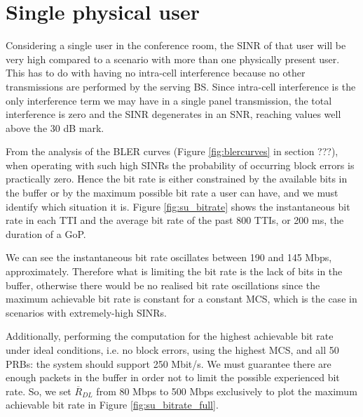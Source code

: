 \section{Single physical user} \label{sec:single-user}

Considering a single user in the conference room, the SINR of that user will be very high compared to a scenario with more than one physically present user. This has to do with having no intra-cell interference because no other transmissions are performed by the serving \acs{BS}. Since intra-cell interference is the only interference term we may have in a single panel transmission, the total interference is zero and the SINR degenerates in an SNR, reaching values well above the 30 dB mark.

From the analysis of the BLER curves (Figure \ref{fig:blercurves} in section ???), when operating with such high SINRs the probability of occurring block errors is practically zero. Hence the bit rate is either constrained by the available bits in the buffer or by the maximum possible bit rate a user can have, and we must identify which situation it is. Figure \ref{fig:su_bitrate} shows the instantaneous bit rate in each TTI and the average bit rate of the past 800 TTIs, or 200 ms, the duration of a \ac{GoP}.

We can see the instantaneous bit rate oscillates between 190 and 145 Mbps, approximately. Therefore what is limiting the bit rate is the lack of bits in the buffer, otherwise there would be no realised bit rate oscillations since the maximum achievable bit rate is constant for a constant MCS, which is the case in scenarios with extremely-high \acsp{SINR}.




Additionally, performing the computation for the highest achievable bit rate under ideal conditions, i.e. no block errors, using the highest \acs{MCS}, and all 50 \acsp{PRB}: the system should support 250 Mbit/s. We must guarantee there are enough packets in the buffer in order not to limit the possible experienced bit rate. So, we set $\overline{R}_{DL}$ from 80 Mbps to 500 Mbps exclusively to plot the maximum achievable bit rate in Figure \ref{fig:su_bitrate_full}. 

